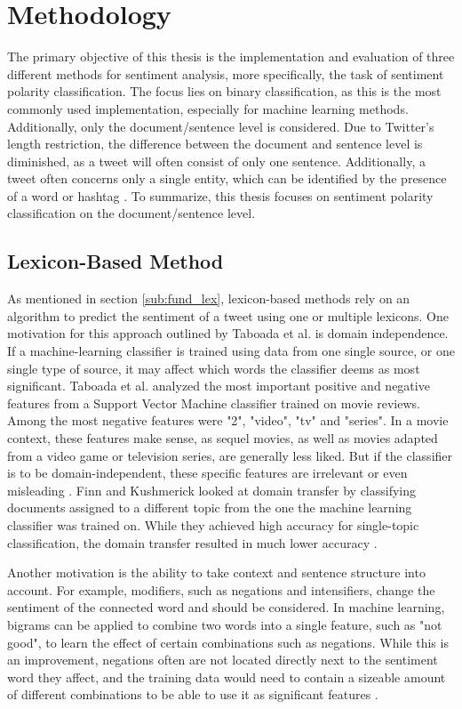 \chapter{Methodology}
\label{cha:Chapter4_Methodology}
The primary objective of this thesis is the implementation and evaluation of three different methods for sentiment analysis, more specifically, the task of sentiment polarity classification. The focus lies on binary classification, as this is the most commonly used implementation, especially for machine learning methods. Additionally, only the document/sentence level is considered. Due to Twitter's length restriction, the difference between the document and sentence level is diminished, as a tweet will often consist of only one sentence. Additionally, a tweet often concerns only a single entity, which can be identified by the presence of a word or hashtag \cite{DBLP:journals/csur/GiachanouC16}. To summarize, this thesis focuses on sentiment polarity classification on the document/sentence level.

\section{Lexicon-Based Method}
As mentioned in section \ref{sub:fund_lex}, lexicon-based methods rely on an algorithm to predict the sentiment of a tweet using one or multiple lexicons. One motivation for this approach outlined by Taboada et al. is domain independence. If a machine-learning classifier is trained using data from one single source, or one single type of source, it may affect which words the classifier deems as most significant. Taboada et al. analyzed the most important positive and negative features from a Support Vector Machine classifier trained on movie reviews. Among the most negative features were "2", "video", "tv" and "series". In a movie context, these features make sense, as sequel movies, as well as movies adapted from a video game or television series, are generally less liked. But if the classifier is to be domain-independent, these specific features are irrelevant or even misleading \cite{taboada}. Finn and Kushmerick looked at domain transfer by classifying documents assigned to a different topic from the one the machine learning classifier was trained on. While they achieved high accuracy for single-topic classification, the domain transfer resulted in much lower accuracy \cite{Finn03learningto}.

Another motivation is the ability to take context and sentence structure into account. For example, modifiers, such as negations and intensifiers, change the sentiment of the connected word and should be considered. In machine learning, bigrams can be applied to combine two words into a single feature, such as "not good", to learn the effect of certain combinations such as negations. While this is an improvement, negations often are not located directly next to the sentiment word they affect, and the training data would need to contain a sizeable amount of different combinations to be able to use it as significant features \cite{taboada}.

